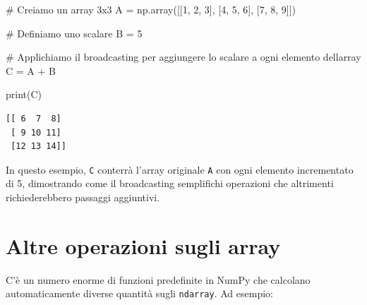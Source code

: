 \documentclass[
  letterpaper,
  krantz2]{{[}./krantz{]}}
\newenvironment{Shaded}{\begin{snugshade}}{\end{snugshade}}
\newcommand{\BuiltInTok}[1]{\textcolor[rgb]{0.00,0.23,0.31}{#1}}
\newcommand{\CommentTok}[1]{\textcolor[rgb]{0.37,0.37,0.37}{#1}}
\newcommand{\DecValTok}[1]{\textcolor[rgb]{0.68,0.00,0.00}{#1}}
\newcommand{\NormalTok}[1]{\textcolor[rgb]{0.00,0.23,0.31}{#1}}
\newcommand{\OperatorTok}[1]{\textcolor[rgb]{0.37,0.37,0.37}{#1}}
\begin{document}
\begin{Shaded}
\begin{Highlighting}[]
\CommentTok{\# Creiamo un array 3x3}
\NormalTok{A }\OperatorTok{=}\NormalTok{ np.array([[}\DecValTok{1}\NormalTok{, }\DecValTok{2}\NormalTok{, }\DecValTok{3}\NormalTok{], [}\DecValTok{4}\NormalTok{, }\DecValTok{5}\NormalTok{, }\DecValTok{6}\NormalTok{], [}\DecValTok{7}\NormalTok{, }\DecValTok{8}\NormalTok{, }\DecValTok{9}\NormalTok{]])}

\CommentTok{\# Definiamo uno scalare}
\NormalTok{B }\OperatorTok{=} \DecValTok{5}

\CommentTok{\# Applichiamo il broadcasting per aggiungere lo scalare a ogni elemento dell\textquotesingle{}array}
\NormalTok{C }\OperatorTok{=}\NormalTok{ A }\OperatorTok{+}\NormalTok{ B}

\BuiltInTok{print}\NormalTok{(C)}
\end{Highlighting}
\end{Shaded}

\begin{verbatim}
[[ 6  7  8]
 [ 9 10 11]
 [12 13 14]]
\end{verbatim}

In questo esempio, \texttt{C} conterrà l'array originale \texttt{A} con
ogni elemento incrementato di 5, dimostrando come il broadcasting
semplifichi operazioni che altrimenti richiederebbero passaggi
aggiuntivi.

\section{Altre operazioni sugli
array}\label{altre-operazioni-sugli-array}

C'è un numero enorme di funzioni predefinite in NumPy che calcolano
automaticamente diverse quantità sugli \texttt{ndarray}. Ad esempio:
\end{document}
